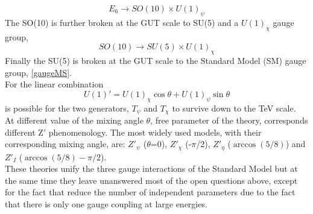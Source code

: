 \[
E_6 \to SO(10) \times U(1)_\psi
\]
The SO(10) is further broken at the GUT scale to SU(5) and a $U(1)_\chi$ gauge group,
\[
SO(10) \to  SU(5) \times U(1)_\chi
\]
Finally the SU(5) is broken at the GUT scale to the Standard Model (SM) gauge group, \ref{gaugeMS}. \\
For the linear combination 
\[
U(1)' = U(1)_\chi \cos\theta  + U(1)_\psi \sin\theta 
\]
is possible for the two generators, $T_\psi$ and $T_\chi$ to survive down to the TeV scale. \\
At different value of the mixing angle $\theta$, free parameter of the theory, corresponds different Z$'$ phenomenology. The most widely used models, with their corresponding mixing angle, are: $Z'_\psi$ ($\theta$=0),  $Z'_\chi$ (-$\pi$/2), $Z'_\eta$ ($\arccos(5/8)$) and  $Z'_I$ ($\arccos(5/8)-\pi/2$). \\
These theories unify the three gauge interactions of the Standard Model but at the same time they leave unanswered most of the open questions above, except for the fact that reduce the number of independent parameters due to the fact that there is only one gauge coupling at large energies. 

